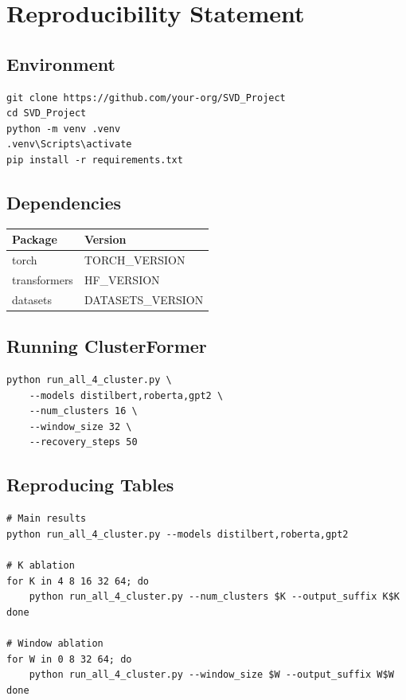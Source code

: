 \section{Reproducibility Statement}

\subsection{Environment}

\begin{lstlisting}
git clone https://github.com/your-org/SVD_Project
cd SVD_Project
python -m venv .venv
.venv\Scripts\activate
pip install -r requirements.txt
\end{lstlisting}

\subsection{Dependencies}

\begin{table}[H]
\centering
\small
\begin{tabular}{ll}
\toprule
\textbf{Package} & \textbf{Version} \\
\midrule
torch & {{TORCH\_VERSION}} \\
transformers & {{HF\_VERSION}} \\
datasets & {{DATASETS\_VERSION}} \\
\bottomrule
\end{tabular}
\end{table}

\subsection{Running ClusterFormer}

\begin{lstlisting}
python run_all_4_cluster.py \
    --models distilbert,roberta,gpt2 \
    --num_clusters 16 \
    --window_size 32 \
    --recovery_steps 50
\end{lstlisting}

\subsection{Reproducing Tables}

\begin{lstlisting}
# Main results
python run_all_4_cluster.py --models distilbert,roberta,gpt2

# K ablation
for K in 4 8 16 32 64; do
    python run_all_4_cluster.py --num_clusters $K --output_suffix K$K
done

# Window ablation
for W in 0 8 32 64; do
    python run_all_4_cluster.py --window_size $W --output_suffix W$W
done
\end{lstlisting}

